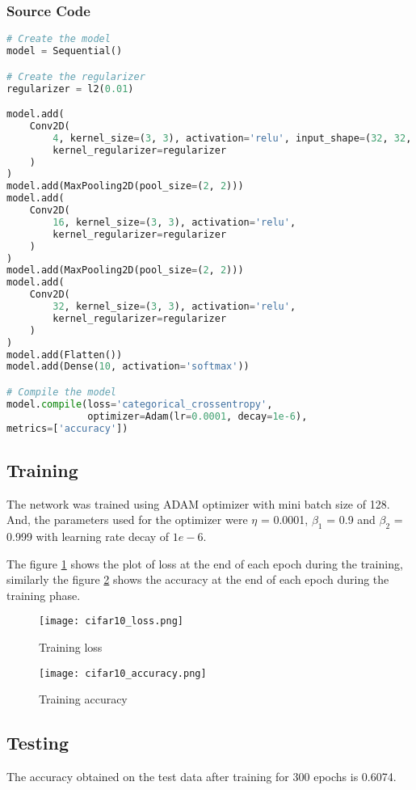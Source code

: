 \documentclass{article}
\begin{document}
\subsubsection{Source Code}
\begin{lstlisting}[language=python]
# Create the model
model = Sequential()

# Create the regularizer
regularizer = l2(0.01)

model.add(
    Conv2D(
        4, kernel_size=(3, 3), activation='relu', input_shape=(32, 32, 3),
        kernel_regularizer=regularizer
    )
)
model.add(MaxPooling2D(pool_size=(2, 2)))
model.add(
    Conv2D(
        16, kernel_size=(3, 3), activation='relu',
        kernel_regularizer=regularizer
    )
)
model.add(MaxPooling2D(pool_size=(2, 2)))
model.add(
    Conv2D(
        32, kernel_size=(3, 3), activation='relu',
        kernel_regularizer=regularizer
    )
)
model.add(Flatten())
model.add(Dense(10, activation='softmax'))

# Compile the model
model.compile(loss='categorical_crossentropy',
              optimizer=Adam(lr=0.0001, decay=1e-6),
metrics=['accuracy'])
\end{lstlisting}

\subsection{Training}
The network was trained using ADAM optimizer with mini batch size of 128. And, the
parameters used for the optimizer were $\eta$ = 0.0001, $\beta_1$ = 0.9 and
$\beta_2$ = 0.999 with learning rate decay of $1e-6$.

The figure \ref{fig:training_loss} shows the plot of loss at the end of each epoch
during the training, similarly the figure \ref{fig:training_accuracy} shows the
accuracy at the end of each epoch during the training phase.

\begin{figure}[!ht]
  \texttt{[image: cifar10\_loss.png]}
  \caption{Training loss}
  \label{fig:training_loss}
\end{figure}

\begin{figure}[!ht]
  \texttt{[image: cifar10\_accuracy.png]}
  \caption{Training accuracy}
  \label{fig:training_accuracy}
\end{figure}

\subsection{Testing}
The accuracy obtained on the test data after training for 300 epochs is 0.6074.
\end{document}

